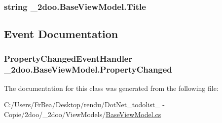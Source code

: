 \hypertarget{class__2doo_1_1_base_view_model_c7a6d8e8fbbf388d1d31864fc7e0f36b}{
\subsubsection[{Title}]{\setlength{\rightskip}{0pt plus 5cm}string \_\-2doo.BaseViewModel.Title}}
\label{class__2doo_1_1_base_view_model_c7a6d8e8fbbf388d1d31864fc7e0f36b}




\subsection{Event Documentation}
\hypertarget{class__2doo_1_1_base_view_model_df404d5944001b6d91d88dd4cac4e682}{
\subsubsection[{PropertyChanged}]{\setlength{\rightskip}{0pt plus 5cm}PropertyChangedEventHandler \_\-2doo.BaseViewModel.PropertyChanged}}
\label{class__2doo_1_1_base_view_model_df404d5944001b6d91d88dd4cac4e682}




The documentation for this class was generated from the following file:\begin{CompactItemize}
\item 
C:/Users/FrBea/Desktop/rendu/DotNet\_\-todolist\_ - Copie/2doo/\_\-2doo/ViewModels/\hyperlink{_base_view_model_8cs}{BaseViewModel.cs}\end{CompactItemize}
